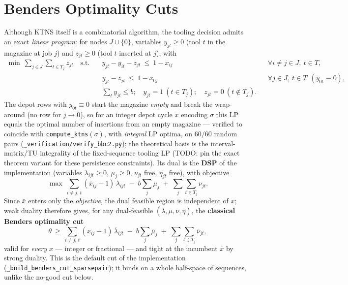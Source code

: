 \documentclass[11pt,a4paper]{article}
\theoremstyle{plain}
\theoremstyle{definition}
\begin{document}
\section{Benders Optimality Cuts}
\label{sec:cuts}

Although KTNS itself is a combinatorial algorithm, the tooling decision admits an exact
\emph{linear program}: for nodes $J\cup\{0\}$, variables $y_{jt}\ge0$ (tool $t$ in the
magazine at job $j$) and $z_{jt}\ge0$ (tool $t$ inserted at $j$), with
\begin{align*}
  \min\ \sum_{j\in J}\sum_{t\in T_j} z_{jt}\quad\text{s.t.}\quad
  & y_{jt}-y_{it}-z_{jt}\ \le\ 1-x_{ij} && \forall i\ne j\in J,\ t\in T,\\
  & y_{jt}-z_{jt}\ \le\ 1-x_{0j} && \forall j\in J,\ t\in T\ \ (y_{0t}\equiv0),\\
  & \textstyle\sum_t y_{jt}\le b;\quad y_{jt}=1\ (t\in T_j);\quad z_{jt}=0\ (t\notin T_j).
\end{align*}
The depot rows with $y_{0t}\equiv0$ start the magazine \emph{empty} and break the
wrap-around (no row for $j\to0$), so for an integer depot cycle $\bar x$ encoding
$\sigma$ this LP equals the optimal number of insertions from an empty magazine ---
verified to coincide with \texttt{compute\_ktns}$(\sigma)$, with \emph{integral} LP optima,
on $60/60$ random pairs (\texttt{\_verification/verify\_bbc2.py}); the theoretical basis
is the interval-matrix/TU integrality of the fixed-sequence tooling LP
\cite{Crama1994,Catanzaro2015} (TODO: pin the exact theorem variant for these
persistence constraints). Its dual is the \textbf{DSP} of the implementation
(variables $\lambda_{ijt}\ge0$, $\mu_j\ge0$, $\nu_{jt}$ free, $\eta_{jt}$ free), with
objective
\[
  \max\ \sum_{i\ne j,\,t}(\bar x_{ij}-1)\,\lambda_{ijt}\;-\;b\sum_j\mu_j\;+\;
  \sum_{j}\sum_{t\in T_j}\nu_{jt}.
\]
Since $\bar x$ enters only the \emph{objective}, the dual feasible region is independent
of $x$; weak duality therefore gives, for any dual-feasible
$(\bar\lambda,\bar\mu,\bar\nu,\bar\eta)$, the \textbf{classical Benders optimality cut}
\[
  \theta\ \ge\ \sum_{i\ne j,\,t}(x_{ij}-1)\,\bar\lambda_{ijt}\;-\;b\sum_j\bar\mu_j\;+\;
  \sum_{j}\sum_{t\in T_j}\bar\nu_{jt},
\]
valid for \emph{every} $x$ --- integer or fractional --- and tight at the incumbent
$\bar x$ by strong duality. This is the default cut of the implementation
(\texttt{\_build\_benders\_cut\_sparsepair}); it binds on a whole half-space of
sequences, unlike the no-good cut below.
\end{document}
